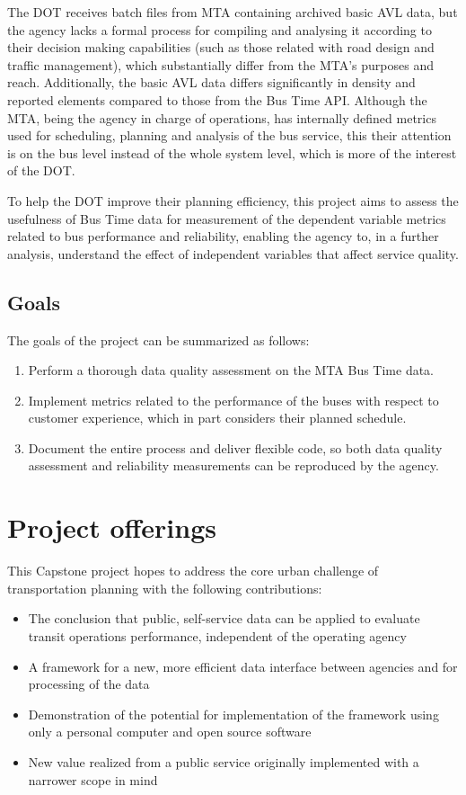 \documentclass[12pt]{report}
\begin{document}
The DOT receives batch files from MTA containing archived basic AVL data, but the agency lacks a formal process for compiling and analysing it according to their decision making capabilities (such as those related with road design and traffic management), which substantially differ from the MTA's purposes and reach.  Additionally, the basic AVL data differs significantly in density and reported elements compared to those from the Bus Time API.  Although the MTA, being the agency in charge of operations, has internally defined metrics used for scheduling, planning and analysis of the bus service, this their attention is on the bus level instead of the whole system level, which is more of the interest of the DOT.
 
To help the DOT improve their planning efficiency, this project aims to assess the usefulness of Bus Time data for measurement of the dependent variable metrics related to bus performance and reliability, enabling the agency to, in a further analysis, understand the effect of independent variables that affect service quality. 

\subsection{Goals}

The goals of the project can be summarized as follows:

\begin{enumerate}
\item Perform a thorough data quality assessment on the MTA Bus Time data.

\item Implement metrics related to the performance of the buses with respect to customer experience, which in part considers their planned schedule.

\item Document the entire process and deliver flexible code, so both data quality assessment and reliability measurements can be reproduced by the agency.
\end{enumerate}

\newpage

\section{Project offerings}

This Capstone project hopes to address the core urban challenge of transportation planning with the following contributions:
\begin{itemize}
\item The conclusion that public, self-service data can be applied to evaluate transit operations performance, independent of the operating agency
\item A framework for a new, more efficient data interface between agencies and for processing of the data
\item Demonstration of the potential for implementation of the framework using only a personal computer and open source software
\item New value realized from a public service originally implemented with a narrower scope in mind
\end{itemize}
\end{document}
